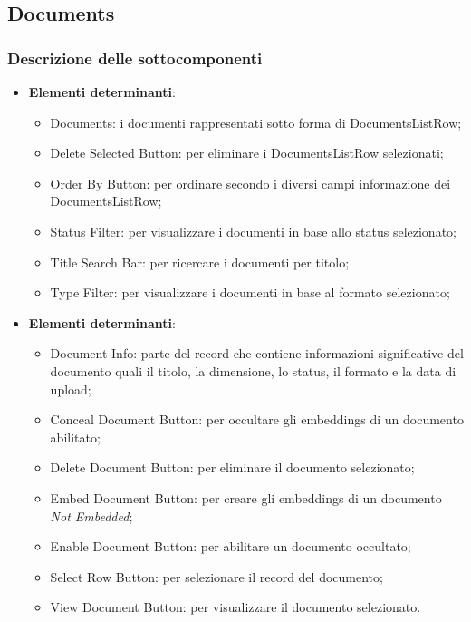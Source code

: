 \documentclass[10pt, a4paper]{article}
\begin{document}

\subsection{Documents}

\subsubsection{Descrizione delle sottocomponenti}

\label{DocumentsListDettaglio}
\begin{itemize}
    \item \textbf{Elementi determinanti}:
     \begin{itemize}
        \item Documents: i documenti rappresentati sotto forma di DocumentsListRow;
        \item Delete Selected Button: per eliminare i DocumentsListRow selezionati;
        \item Order By Button: per ordinare secondo i diversi campi informazione dei DocumentsListRow;
        \item Status Filter: per visualizzare i documenti in base allo status selezionato;
        \item Title Search Bar: per ricercare i documenti per titolo;
        \item Type Filter: per visualizzare i documenti in base al formato selezionato; 
    \end{itemize}
\end{itemize}


\label{DocumentsListRowDettaglio}
\begin{itemize}
    \item \textbf{Elementi determinanti}:
     \begin{itemize}
        \item Document Info: parte del record che contiene informazioni significative del documento quali il titolo, la dimensione, lo status, il formato e la data di upload;
        \item Conceal Document Button: per occultare gli embeddings di un documento abilitato;
        \item Delete Document Button: per eliminare il documento selezionato;
        \item Embed Document Button: per creare gli embeddings di un documento \textit{Not Embedded};
        \item Enable Document Button: per abilitare un documento occultato;
        \item Select Row Button: per selezionare il record del documento;
        \item View Document Button: per visualizzare il documento selezionato.
    \end{itemize}
\end{itemize}
\end{document}
